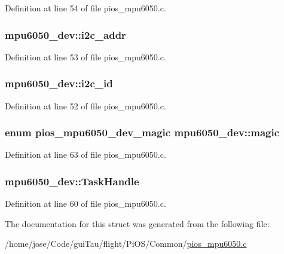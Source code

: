 Definition at line 54 of file pios\-\_\-mpu6050.\-c.

\hypertarget{structmpu6050__dev_a62f37e4827ac7856727a18e7cc6a252d}{
\subsubsection[{i2c\-\_\-addr}]{ mpu6050\-\_\-dev\-::i2c\-\_\-addr}}\label{structmpu6050__dev_a62f37e4827ac7856727a18e7cc6a252d}


Definition at line 53 of file pios\-\_\-mpu6050.\-c.

\hypertarget{structmpu6050__dev_ac0c61d2a2005659c182ca98984b49dd1}{
\subsubsection[{i2c\-\_\-id}]{ mpu6050\-\_\-dev\-::i2c\-\_\-id}}\label{structmpu6050__dev_ac0c61d2a2005659c182ca98984b49dd1}


Definition at line 52 of file pios\-\_\-mpu6050.\-c.

\hypertarget{structmpu6050__dev_acc91a02bd2c3ea3808aa09d4358d56ea}{
\subsubsection[{magic}]{\setlength{\rightskip}{0pt plus 5cm}enum {\bf pios\-\_\-mpu6050\-\_\-dev\-\_\-magic} mpu6050\-\_\-dev\-::magic}}\label{structmpu6050__dev_acc91a02bd2c3ea3808aa09d4358d56ea}


Definition at line 63 of file pios\-\_\-mpu6050.\-c.

\hypertarget{structmpu6050__dev_ae7f409a90546c5e2c100212a0bd63d94}{
\subsubsection[{Task\-Handle}]{ mpu6050\-\_\-dev\-::\-Task\-Handle}}\label{structmpu6050__dev_ae7f409a90546c5e2c100212a0bd63d94}


Definition at line 60 of file pios\-\_\-mpu6050.\-c.



The documentation for this struct was generated from the following file\-:\begin{DoxyCompactItemize}
\item 
/home/jose/\-Code/gui\-Tau/flight/\-Pi\-O\-S/\-Common/\hyperlink{pios__mpu6050_8c}{pios\-\_\-mpu6050.\-c}\end{DoxyCompactItemize}
